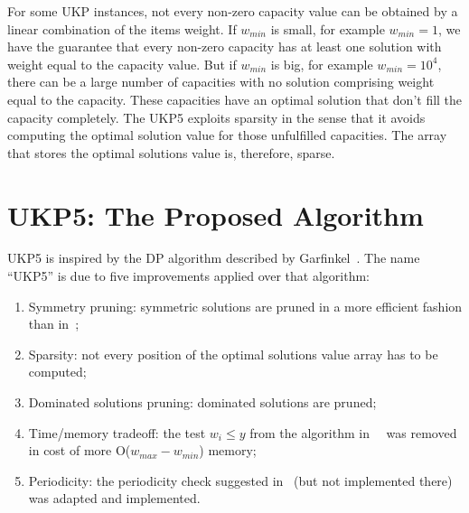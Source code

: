 \documentclass[runningheads,a4paper]{llncs}
\begin{document}

For some UKP instances, not every non-zero capacity value can be obtained by a linear combination of the items weight. 
If \(w_{min}\) is small, for example \(w_{min} = 1\), we have the guarantee that every non-zero capacity has at least one solution with weight equal to the capacity value.
But if \(w_{min}\) is big, for example \(w_{min} = 10^4\), there can be a large number of capacities with no solution comprising weight equal to the capacity. 
These capacities have an optimal solution that don't fill the capacity completely. 
The UKP5 exploits sparsity in the sense that it avoids computing the optimal solution value for those unfulfilled capacities. 
The array that stores the optimal solutions value is, therefore, sparse.

\section{UKP5: The Proposed Algorithm}
\label{sec:ukp5}

UKP5 is inspired by the DP algorithm described by Garfinkel~\cite[p. 221]{gar72}. 
The name ``UKP5'' is due to five improvements applied over that algorithm:

\begin{enumerate}
  \item Symmetry pruning: symmetric solutions are pruned in a more efficient fashion than in~\cite{gar72};
  \item Sparsity: not every position of the optimal solutions value array has to be computed;
  \item Dominated solutions pruning: dominated solutions are pruned;
  \item Time/memory tradeoff: the test \(w_i \leq y\) from the algorithm in~~\cite{gar72} was removed in cost of more O($w_{max}-w_{min}$) memory;
  \item Periodicity: the periodicity check suggested in~\cite{gar72} (but not implemented there) was adapted and implemented.
\end{enumerate}
\end{document}
